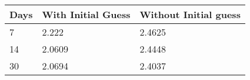 \begin{tabular}{lll}
Days & With Initial Guess & Without Initial guess \\ 
\hline 
7 & 2.222 & 2.4625 \\ 
14 & 2.0609 & 2.4448 \\ 
30 & 2.0694 & 2.4037 \\ 
\hline 
\end{tabular}